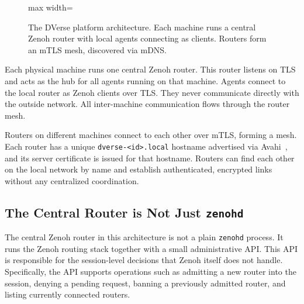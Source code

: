 \documentclass[11pt,a4paper]{article}
\begin{document}
\begin{figure}[H]
\begin{adjustbox}{max width=\textwidth}
  \end{adjustbox}
  \caption{The DVerse platform architecture. Each machine runs a
    central Zenoh router with local agents connecting as clients.
  Routers form an mTLS mesh, discovered via mDNS.}
  \label{fig:architecture}
\end{figure}

Each physical machine runs one central Zenoh router. This router
listens on TLS and acts as the hub for all agents running on that
machine. Agents connect to the local router as Zenoh clients over
TLS. They never communicate directly with the outside network. All
inter-machine communication flows through the router mesh.

Routers on different machines connect to each other over mTLS,
forming a mesh. Each router has a unique \texttt{dverse-<id>.local}
hostname advertised via Avahi~\citep{avahi}, and its server
certificate is issued for that hostname. Routers can find each other
on the local network by name and establish authenticated, encrypted
links without any centralized coordination.

\subsection{The Central Router is Not Just \texttt{zenohd}}

The central Zenoh router in this architecture is not a plain
\texttt{zenohd} process. It runs the Zenoh routing stack together
with a small administrative API. This API is responsible for the
session-level decisions that Zenoh itself does not handle.
Specifically, the API supports operations such as admitting a new
router into the session, denying a pending request, banning a
previously admitted router, and listing currently connected routers.
\end{document}
